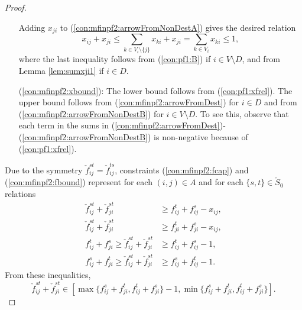 \begin{proof}
\begin{itemize}[leftmargin=1cm]
 Adding $x_{ji}$ to (\ref{con:mfinpf2:arrowFromNonDestA}) gives the desired relation
\[
x_{ij}+x_{ji}\leq\sum_{k\in V_i\setminus\{j\}}x_{ki} +x_{ji}=\sum_{k\in V_i}x_{ki}\leq 1,
\]
where the last inequality follows from (\ref{con:pf1:B}) if $i\in V\setminus D$, and from Lemma \ref{lem:sumxji1} if $i\in D$.
\item[ (\ref{con:mfinpf2:xbound}):] The lower bound follows from (\ref{con:pf1:xfrel}). The upper bound follows from (\ref{con:mfinpf2:arrowFromDest}) for $i\in D$ and from (\ref{con:mfinpf2:arrowFromNonDestB}) for $i\in V\setminus D$. To see this, observe that each term in the sums in (\ref{con:mfinpf2:arrowFromDest})-(\ref{con:mfinpf2:arrowFromNonDestB}) is non-negative because of (\ref{con:pf1:xfrel}). 
\end{itemize}
Due to the symmetry $\check{f}^{st}_{ij} = \check{f}^{ts}_{ij}$, constraints (\ref{con:mfinpf2:fcap}) and (\ref{con:mfinpf2:fbound}) represent for each $(i,j)\in A$ and for each $\{s,t\}\in \check{S}_0$ relations
\begin{subequations}
\begin{align}
\label{fcapa}\check{f}^{st}_{ij} + \check{f}^{st}_{ji} &\geq f^t_{ij} + f^s_{ij}-x_{ij}, \\
\label{fcapb}\check{f}^{st}_{ij} + \check{f}^{st}_{ji} &\geq f^t_{ji} + f^s_{ji}-x_{ij}, \\
\label{fbounda}f^t_{ij}+ f^s_{ji}\geq\check{f}^{st}_{ij} + \check{f}^{st}_{ji} &\geq f^t_{ij} + f^s_{ij}-1, \\
\label{fboundb}f^s_{ij}+ f^t_{ji}\geq\check{f}^{st}_{ij} + \check{f}^{st}_{ji} &\geq f^s_{ij} + f^t_{ij}-1. 
\end{align}
\end{subequations}
From these inequalities,
$$
\check{f}^{st}_{ij} + \check{f}^{st}_{ji}\in\left[\max\{f^s_{ij}+f^t_{ji},f^t_{ij}+f^s_{ji}\}-1,\min\{f^s_{ij}+f^t_{ji},f^t_{ij}+f^s_{ji}\}\right].
$$
\end{proof}

